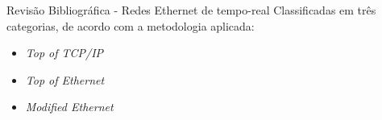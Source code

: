 \begin{frame}{Revis\~{a}o Bibliogr\'{a}fica - Redes Ethernet de tempo-real}
	Classificadas em tr\^{e}s categorias, de acordo com a metodologia aplicada:
	\begin{itemize}
		\item \emph{Top of TCP/IP} %
		\item \emph{Top of Ethernet} %
		\item \emph{Modified Ethernet} %
	\end{itemize}
\end{frame}